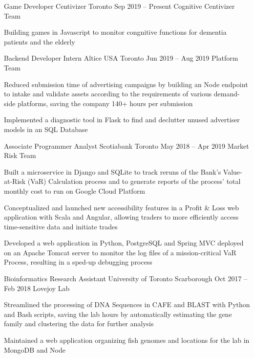 \begin{cventries}
  \cventry
    {Game Developer}
    {Centivizer}
    {Toronto}
    {Sep 2019 -- Present}
    {Cognitive Centivizer Team}
    {
      \begin{cvitems}
        \item {Building games in Javascript to monitor congnitive functions for dementia patients and the elderly}
      \end{cvitems}
    }
  \cventry
    {Backend Developer Intern}
    {Altice USA}
    {Toronto}
    {Jun 2019 -- Aug 2019}
    {Platform Team}
    {
    \begin{cvitems}
      \item {Reduced submission time of advertising campaigns by building an Node endpoint to intake and validate assets according to the requirements of various demand-side platforms, saving the company 140+ hours per submission}
      \item {Implemented a diagnostic tool in Flask to find and declutter unused advertiser models in an SQL Database}
    \end{cvitems}
    }
  \cventry
    {Associate Programmer Analyst}
    {Scotiabank}
    {Toronto}
    {May 2018 -- Apr 2019}
    {Market Risk Team}
    {
      \begin{cvitems}
        \item {Built a microservice in Django and SQLite to track reruns of the Bank's Value-at-Risk (VaR) Calculation process and to generate reports of the process' total monthly cost to run on Google Cloud Platform}
        \item {Conceptualized and launched new accessibility features in a Profit \& Loss web application with Scala and Angular, allowing traders to more efficiently access time-sensitive data and initiate trades}
        \item {Developed a web application in Python, PostgreSQL and Spring MVC deployed on an Apache Tomcat server to monitor the log files of a mission-critical VaR Process, resulting in a sped-up debugging process}
      \end{cvitems}
    }

  \cventry
    {Bioinformatics Research Assistant}
    {University of Toronto}
    {Scarborough}
    {Oct 2017 -- Feb 2018}
    {Lovejoy Lab}
    {
      \begin{cvitems}
        \item {Streamlined the processing of DNA Sequences in CAFE and BLAST with Python and Bash scripts, saving the lab hours by automatically estimating the gene family and clustering the data for further analysis}
        \item {Maintained a web application organizing fish genomes and locations for the lab in MongoDB and Node}
      \end{cvitems}
    }
\end{cventries}
